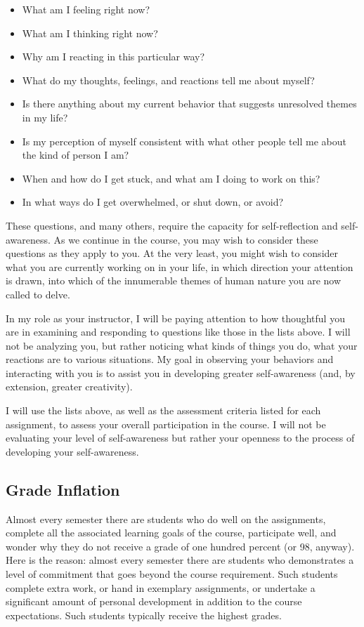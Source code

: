 \documentclass[letterpaper,10pt,headsepline]{scrreprt}
\begin{document}
\begin{itemize}
\item What am I feeling right now?
\item What am I thinking right now?
\item Why am I reacting in this particular way?
\item What do my thoughts, feelings, and reactions tell me about myself?
\item Is there anything about my current behavior that suggests unresolved themes in my life?
\item Is my perception of myself consistent with what other people tell me about the kind of person I am?
\item When and how do I get stuck, and what am I doing to work on this?
\item In what ways do I get overwhelmed, or shut down, or avoid?
 
\end{itemize}

These questions, and many others, require the capacity for self-reflection and self-awareness. As we continue in the course, you may wish to consider these questions as they apply to you. At the very least, you might wish to consider what you are currently working on in your life, in which direction your attention is drawn, into which of the innumerable themes of human nature you are now called to delve.

In my role as your instructor, I will be paying attention to how thoughtful you are in examining and responding to questions like those in the lists above. I will not be analyzing you, but rather noticing what kinds of things you do, what your reactions are to various situations. My goal in observing your behaviors and interacting with you is to assist you in developing greater self-awareness (and, by extension, greater creativity).

I will use the lists above, as well as the assessment criteria listed for each assignment, to assess your overall participation in the course. I will not be evaluating your level of self-awareness but rather your openness to the process of developing your self-awareness.

\subsection{Grade Inflation}
Almost every semester there are students who do well on the assignments, complete all the associated learning goals of the course, participate well, and wonder why they do not receive a grade of one hundred percent (or 98, anyway). Here is the reason: almost every semester there are students who demonstrates a level of commitment that goes beyond the course requirement. Such students complete extra work, or hand in exemplary assignments, or undertake a significant amount of personal development in addition to the course expectations. Such students typically receive the highest grades.
\end{document}
